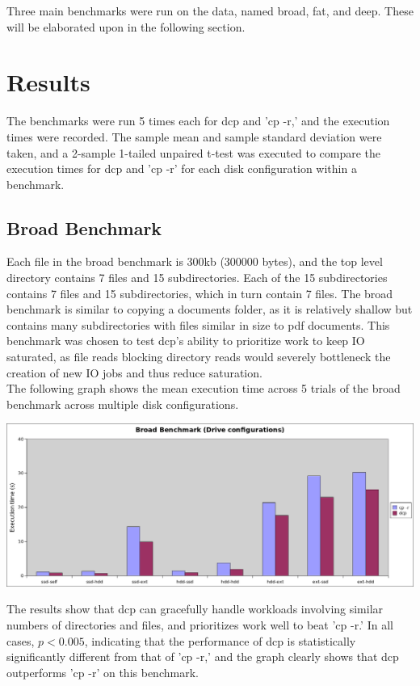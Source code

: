 \documentclass[12pt]{article}
\begin{document}
Three main benchmarks were run on the data, named broad, fat, and deep.
These will be elaborated upon in the following section.\\

\section{Results}
The benchmarks were run 5 times each for dcp and 'cp -r,' and the execution
times were recorded. The sample mean and sample standard deviation were taken,
and a 2-sample 1-tailed unpaired t-test was executed to compare the execution
times for dcp and 'cp -r' for each disk configuration within a benchmark.\\

\subsection{Broad Benchmark}
Each file in the broad benchmark is 300kb (300000 bytes), and
the top level directory contains 7 files and 15 subdirectories. Each of the 15 subdirectories
contains 7 files and 15 subdirectories, which in turn contain 7 files.
The broad benchmark is similar to copying a  documents folder, as it is
relatively shallow but contains many subdirectories with files similar in size to
pdf documents. This benchmark was chosen to test dcp's ability to prioritize work
to keep IO saturated, as file reads blocking directory reads would severely bottleneck
the creation of new IO jobs and thus reduce saturation.\\
\noindent
The following graph shows the mean execution time across 5 trials of the broad benchmark across multiple disk configurations.
\vspace{5mm}

\includegraphics[width=500pt]{report/graphs/broad-manydisk.png}

\vspace{5mm}

The results show that dcp can gracefully handle workloads involving
similar numbers of directories and files, and prioritizes work
well to beat 'cp -r.' In all cases, $p < 0.005$, indicating that
the performance of dcp is statistically significantly different from
that of 'cp -r,' and the graph clearly shows that dcp outperforms
'cp -r' on this benchmark. \\
\end{document}
